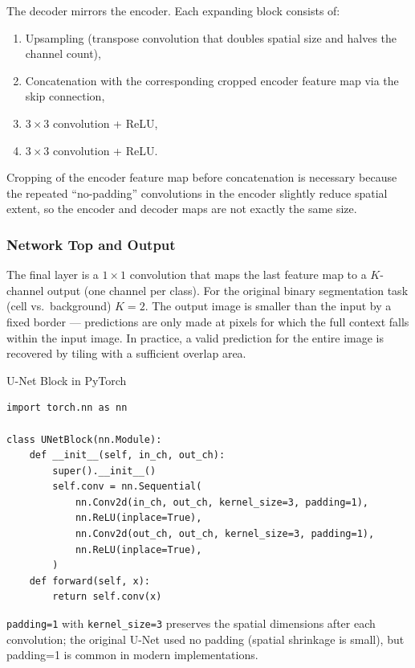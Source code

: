 \documentclass[11pt,a4paper]{article}
\begin{document}
The decoder mirrors the encoder. Each expanding block consists of:
\begin{enumerate}
  \item Upsampling (transpose convolution that doubles spatial size and halves the channel count),
  \item Concatenation with the corresponding cropped encoder feature map via the skip connection,
  \item $3\times 3$ convolution + ReLU,
  \item $3\times 3$ convolution + ReLU.
\end{enumerate}
Cropping of the encoder feature map before concatenation is necessary because the repeated ``no-padding'' convolutions in the encoder slightly reduce spatial extent, so the encoder and decoder maps are not exactly the same size.

\subsubsection{Network Top and Output}

The final layer is a $1\times 1$ convolution that maps the last feature map to a $K$-channel output (one channel per class). For the original binary segmentation task (cell vs.\ background) $K = 2$. The output image is smaller than the input by a fixed border — predictions are only made at pixels for which the full context falls within the input image. In practice, a valid prediction for the entire image is recovered by tiling with a sufficient overlap area.

\begin{defbox}{U-Net Block in PyTorch}
\begin{lstlisting}[caption={One contracting block of U-Net in PyTorch}]
import torch.nn as nn

class UNetBlock(nn.Module):
    def __init__(self, in_ch, out_ch):
        super().__init__()
        self.conv = nn.Sequential(
            nn.Conv2d(in_ch, out_ch, kernel_size=3, padding=1),
            nn.ReLU(inplace=True),
            nn.Conv2d(out_ch, out_ch, kernel_size=3, padding=1),
            nn.ReLU(inplace=True),
        )
    def forward(self, x):
        return self.conv(x)
\end{lstlisting}
\texttt{padding=1} with \texttt{kernel\_size=3} preserves the spatial dimensions after each convolution; the original U-Net used no padding (spatial shrinkage is small), but padding=1 is common in modern implementations.
\end{defbox}
\end{document}

